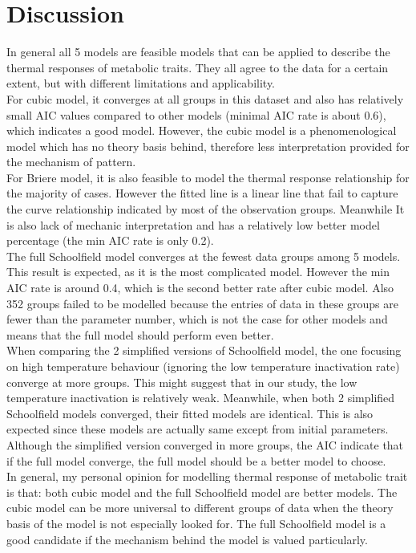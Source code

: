 \documentclass[12pt,a4paper]{article}
\begin{document}
\section{Discussion}
In general all 5 models are feasible models that can be applied to describe the thermal responses of metabolic traits. They all agree to the data for a certain extent, but with different limitations and applicability. 
\\
For cubic model, it converges at all groups in this dataset and also has relatively small AIC values compared to other models (minimal AIC rate is about 0.6), which indicates a good model. However, the cubic model is a phenomenological model which has no theory basis behind, therefore less interpretation provided for the mechanism of pattern. 
\\
For Briere model, it is also feasible to model the thermal response relationship for the majority of cases. However the fitted line is a linear line that fail to capture the curve relationship indicated by most of the observation groups. Meanwhile It is also lack of mechanic interpretation and has a relatively low better model percentage (the min AIC rate is only 0.2).
\\
The full Schoolfield model converges at the fewest data groups among 5 models. This result is expected, as it is the most complicated model. However the min AIC rate is around 0.4, which is the second better rate after cubic model. Also 352 groups failed to be modelled because the entries of data in these groups are fewer than the parameter number, which is not the case for other models and means that the full model should perform even better.
\\
When comparing the 2 simplified versions of Schoolfield model, the one focusing on high temperature behaviour (ignoring the low temperature inactivation rate) converge at more groups. This might suggest that in our study, the low temperature inactivation is relatively weak. Meanwhile, when both 2 simplified Schoolfield models converged, their fitted models are identical. This is also expected since these models are actually same except from initial parameters.
Although the simplified version converged in more groups, the AIC indicate that if the full model converge, the full model should be a better model to choose.
\\
In general, my personal opinion for modelling thermal response of metabolic trait is that: both cubic model and the full Schoolfield model are better models. The cubic model can be more universal to different groups of data when the theory basis of the model is not especially looked for. The full Schoolfield model is a good candidate if the mechanism behind the model is valued particularly.
\end{document}
